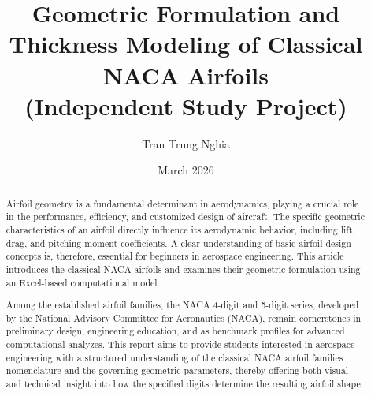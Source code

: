 \documentclass[12pt]{report}
\title{\huge \textbf{Geometric Formulation and Thickness Modeling of Classical NACA Airfoils} \\[8pt] 
\large (Independent Study Project)}
\author{\large Tran Trung Nghia}
\date{\large March 2026}
\begin{document}
\maketitle
\begin{abstract}
\noindent
Airfoil geometry is a fundamental determinant in aerodynamics, playing a crucial role in the performance, efficiency, and customized design of aircraft. 
The specific geometric characteristics of an airfoil directly influence its aerodynamic behavior, including lift, drag, and pitching moment coefficients. 
A clear understanding of basic airfoil design concepts is, 
therefore, essential for beginners in aerospace engineering. 
This article introduces the classical NACA airfoils and examines their geometric formulation using an Excel-based computational model.

Among the established airfoil families, 
the NACA 4-digit and 5-digit series, 
developed by the National Advisory Committee for Aeronautics (NACA), 
remain cornerstones in preliminary design, engineering education, and as benchmark profiles for advanced computational analyzes. 
This report aims to provide students interested in aerospace engineering with a structured understanding of the classical NACA airfoil families nomenclature and the governing geometric parameters, 
thereby offering both visual and technical insight into how the specified digits determine the resulting airfoil shape.
\end{abstract}










\end{document}
